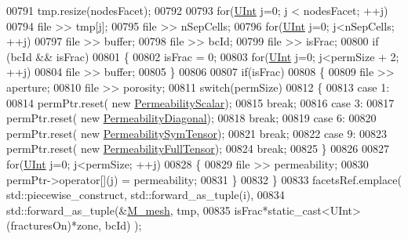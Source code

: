 \begin{DoxyCode}
00791         tmp.resize(nodesFacet);
00792 
00793         \textcolor{keywordflow}{for}(\hyperlink{namespaceFVCode3D_a4bf7e328c75d0fd504050d040ebe9eda}{UInt} j=0; j < nodesFacet; ++j)
00794             file >> tmp[j];
00795         file >> nSepCells;
00796         \textcolor{keywordflow}{for}(\hyperlink{namespaceFVCode3D_a4bf7e328c75d0fd504050d040ebe9eda}{UInt} j=0; j<nSepCells; ++j)
00797             file >> buffer;
00798         file >> bcId;
00799         file >> isFrac;
00800         \textcolor{keywordflow}{if} (bcId && isFrac)
00801         \{
00802             isFrac = 0;
00803             \textcolor{keywordflow}{for}(\hyperlink{namespaceFVCode3D_a4bf7e328c75d0fd504050d040ebe9eda}{UInt} j=0; j<permSize + 2; ++j)
00804                 file >> buffer;
00805         \}
00806 
00807         \textcolor{keywordflow}{if}(isFrac)
00808         \{
00809             file >> aperture;
00810             file >> porosity;
00811             \textcolor{keywordflow}{switch}(permSize)
00812             \{
00813                 \textcolor{keywordflow}{case} 1:
00814                     permPtr.reset( \textcolor{keyword}{new} \hyperlink{classFVCode3D_1_1PermeabilityScalar}{PermeabilityScalar});
00815                     \textcolor{keywordflow}{break};
00816                 \textcolor{keywordflow}{case} 3:
00817                     permPtr.reset( \textcolor{keyword}{new} \hyperlink{classFVCode3D_1_1PermeabilityDiagonal}{PermeabilityDiagonal});
00818                     \textcolor{keywordflow}{break};
00819                 \textcolor{keywordflow}{case} 6:
00820                     permPtr.reset( \textcolor{keyword}{new} \hyperlink{classFVCode3D_1_1PermeabilitySymTensor}{PermeabilitySymTensor});
00821                     \textcolor{keywordflow}{break};
00822                 \textcolor{keywordflow}{case} 9:
00823                     permPtr.reset( \textcolor{keyword}{new} \hyperlink{classFVCode3D_1_1PermeabilityFullTensor}{PermeabilityFullTensor});
00824                     \textcolor{keywordflow}{break};
00825             \}
00826 
00827             \textcolor{keywordflow}{for}(\hyperlink{namespaceFVCode3D_a4bf7e328c75d0fd504050d040ebe9eda}{UInt} j=0; j<permSize; ++j)
00828             \{
00829                 file >> permeability;
00830                 permPtr->operator[](j) = permeability;
00831             \}
00832         \}
00833         facetsRef.emplace( std::piecewise\_construct, std::forward\_as\_tuple(i),
00834                            std::forward\_as\_tuple(&\hyperlink{classFVCode3D_1_1Importer_a6f1542d6c6ac192e36c8eec7dc366653}{M\_mesh}, tmp,
00835                            isFrac*static\_cast<UInt>(fracturesOn)*zone, bcId) );

\end{DoxyCode}
